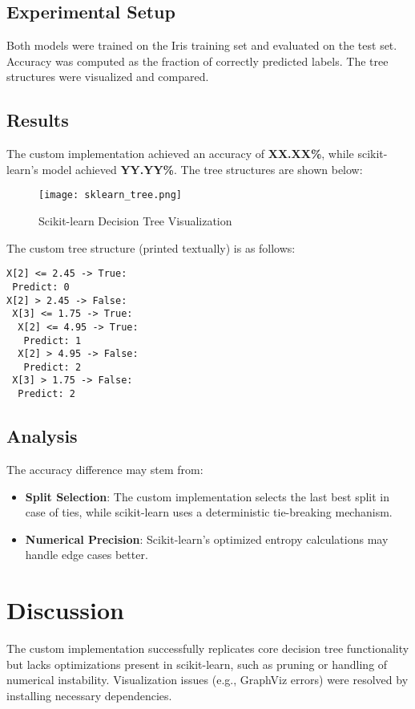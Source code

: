 \documentclass[a4paper,12pt]{article}
\begin{document}
\subsection{Experimental Setup}
Both models were trained on the Iris training set and evaluated on the test set. Accuracy was computed as the fraction of correctly predicted labels. The tree structures were visualized and compared.

\subsection{Results}
The custom implementation achieved an accuracy of \textbf{XX.XX\%}, while scikit-learn’s model achieved \textbf{YY.YY\%}. The tree structures are shown below:

\begin{figure}[h]
    \centering
    \texttt{[image: sklearn\_tree.png]} %
    \caption{Scikit-learn Decision Tree Visualization}
    \label{fig:sklearn_tree}
\end{figure}

The custom tree structure (printed textually) is as follows:
\begin{verbatim}
X[2] <= 2.45 -> True:
 Predict: 0
X[2] > 2.45 -> False:
 X[3] <= 1.75 -> True:
  X[2] <= 4.95 -> True:
   Predict: 1
  X[2] > 4.95 -> False:
   Predict: 2
 X[3] > 1.75 -> False:
  Predict: 2
\end{verbatim}

\subsection{Analysis}
The accuracy difference may stem from:
\begin{itemize}
    \item \textbf{Split Selection}: The custom implementation selects the last best split in case of ties, while scikit-learn uses a deterministic tie-breaking mechanism.
    \item \textbf{Numerical Precision}: Scikit-learn’s optimized entropy calculations may handle edge cases better.
\end{itemize}

\section{Discussion}
The custom implementation successfully replicates core decision tree functionality but lacks optimizations present in scikit-learn, such as pruning or handling of numerical instability. Visualization issues (e.g., GraphViz errors) were resolved by installing necessary dependencies.
\end{document}

